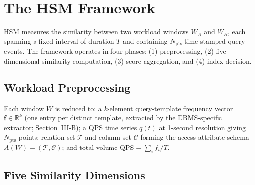 \documentclass[10pt,twocolumn,a4paper]{article}
\newcommand{\Npts}{N_{\mathrm{pts}}}
\begin{document}
\section{The HSM Framework}

HSM measures the similarity between two workload windows $W_A$ and $W_B$,
each spanning a fixed interval of duration $T$ and containing $\Npts$
time-stamped query events. The framework operates in four phases: (1)
preprocessing, (2) five-dimensional similarity computation, (3) score
aggregation, and (4) index decision.

\subsection{Workload Preprocessing}

Each window $W$ is reduced to: a $k$-element query-template frequency
vector $\mathbf{f}\!\in\!\mathbb{R}^k$ (one entry per distinct template,
extracted by the DBMS-specific extractor; Section~III-B); a QPS time
series $q(t)$ at 1-second resolution giving $\Npts$ points; relation set
$\mathcal{T}$ and column set $\mathcal{C}$ forming the access-attribute
schema $A(W)\!=\!(\mathcal{T},\mathcal{C})$; and total volume
$\mathrm{QPS}\!=\!\sum_i f_i/T$.

\subsection{Five Similarity Dimensions}
\end{document}
